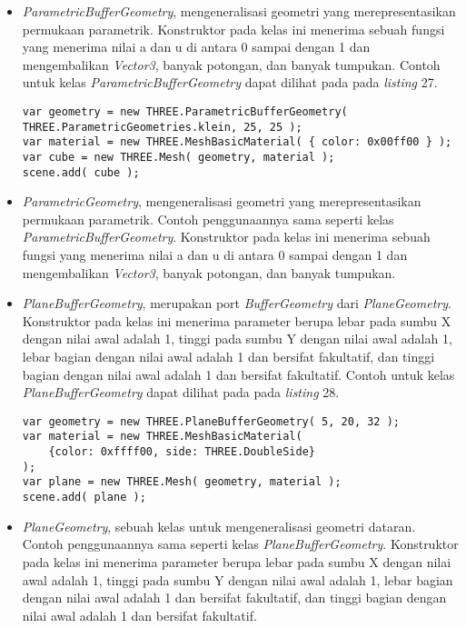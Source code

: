 \documentclass[a4paper,twoside]{article}
\begin{document}
\begin{enumerate}
\begin{itemize}
\begin{itemize}
	\item {\it ParametricBufferGeometry}, mengeneralisasi geometri yang merepresentasikan permukaan parametrik. Konstruktor pada kelas ini menerima sebuah fungsi yang menerima nilai a dan u di antara 0 sampai dengan 1 dan mengembalikan {\it Vector3}, banyak potongan, dan banyak tumpukan. Contoh untuk kelas {\it ParametricBufferGeometry} dapat dilihat pada pada {\it listing} 27.
	
\begin{lstlisting}[caption={Contoh penggunaan kelas {\it ParametricBufferGeometry}.},captionpos=b]
var geometry = new THREE.ParametricBufferGeometry( 
THREE.ParametricGeometries.klein, 25, 25 );
var material = new THREE.MeshBasicMaterial( { color: 0x00ff00 } );
var cube = new THREE.Mesh( geometry, material );
scene.add( cube );
\end{lstlisting}

	\item {\it ParametricGeometry}, mengeneralisasi geometri yang merepresentasikan permukaan parametrik. Contoh penggunaannya sama seperti kelas {\it ParametricBufferGeometry}. Konstruktor pada kelas ini menerima sebuah fungsi yang menerima nilai a dan u di antara 0 sampai dengan 1 dan mengembalikan {\it Vector3}, banyak potongan, dan banyak tumpukan.
	
	\item {\it PlaneBufferGeometry}, merupakan port {\it BufferGeometry} dari {\it PlaneGeometry}. Konstruktor pada kelas ini menerima parameter berupa lebar pada sumbu X dengan nilai awal adalah 1, tinggi pada sumbu Y dengan nilai awal adalah 1, lebar bagian dengan nilai awal adalah 1 dan bersifat fakultatif, dan tinggi bagian dengan nilai awal adalah 1 dan bersifat fakultatif. Contoh untuk kelas {\it PlaneBufferGeometry} dapat dilihat pada pada {\it listing} 28.
	
\begin{lstlisting}[caption={Contoh penggunaan kelas {\it PlaneBufferGeometry}.},captionpos=b]
var geometry = new THREE.PlaneBufferGeometry( 5, 20, 32 );
var material = new THREE.MeshBasicMaterial( 
	{color: 0xffff00, side: THREE.DoubleSide} 
);
var plane = new THREE.Mesh( geometry, material );
scene.add( plane );
\end{lstlisting}

	\item {\it PlaneGeometry}, sebuah kelas untuk mengeneralisasi geometri dataran. Contoh penggunaannya sama seperti kelas {\it PlaneBufferGeometry}. Konstruktor pada kelas ini menerima parameter berupa lebar pada sumbu X dengan nilai awal adalah 1, tinggi pada sumbu Y dengan nilai awal adalah 1, lebar bagian dengan nilai awal adalah 1 dan bersifat fakultatif, dan tinggi bagian dengan nilai awal adalah 1 dan bersifat fakultatif.
	

\end{itemize}
\end{itemize}
\end{enumerate}
\end{document}
